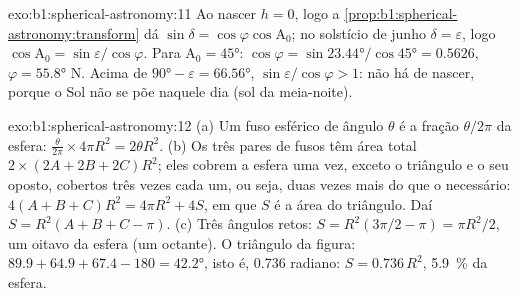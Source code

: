 \begin{solution}{exo:b1:spherical-astronomy:11}
Ao nascer $h = 0$, logo a \cref{prop:b1:spherical-astronomy:transform} dá
$\sin\delta = \cos\varphi\cos\mathrm{A}_0$; no solstício de junho
$\delta = \varepsilon$, logo $\cos\mathrm{A}_0 = \sin\varepsilon/\cos\varphi$.
Para $\mathrm{A}_0 = \ang{45}$: $\cos\varphi = \sin\ang{23.44}/\cos\ang{45} =
0.5626$, $\varphi = \ang{55.8}$ N. Acima de $\ang{90} - \varepsilon =
\ang{66.56}$, $\sin\varepsilon/\cos\varphi > 1$: não há  de nascer,
porque o Sol não se põe naquele dia (sol da meia-noite).
\end{solution}

\begin{solution}{exo:b1:spherical-astronomy:12}
(a) Um fuso esférico de ângulo $\theta$ é a fração $\theta/2\pi$ da esfera:
$\frac{\theta}{2\pi}\times4\pi R^2 = 2\theta R^2$. (b) Os três pares de fusos
têm área total $2\times(2A + 2B + 2C)R^2$; eles cobrem a esfera uma vez,
exceto o triângulo e o seu oposto, cobertos três vezes cada um, ou seja,
duas vezes mais do que o necessário: $4(A + B + C)R^2 = 4\pi R^2 + 4S$, em
que $S$ é a área do triângulo. Daí $S = R^2(A + B + C - \pi)$. (c) Três ângulos
retos: $S = R^2(3\pi/2 - \pi) = \pi R^2/2$, um oitavo da esfera (um octante).
O triângulo da figura: $89.9 + 64.9 + 67.4 - 180 = \ang{42.2}$, isto é,
\num{0.736} radiano: $S = 0.736\,R^2$, \qty{5.9}{\percent} da esfera.
\end{solution}

